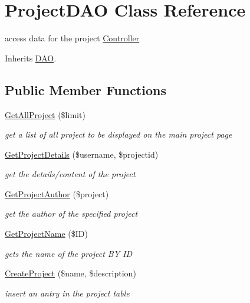 \hypertarget{class_project_d_a_o}{}\section{Project\+D\+AO Class Reference}
\label{class_project_d_a_o}


access data for the project \hyperlink{class_controller}{Controller}  




Inherits \hyperlink{class_d_a_o}{D\+AO}.

\subsection*{Public Member Functions}
\begin{DoxyCompactItemize}
\item 
\hyperlink{class_project_d_a_o_a66f83737d74fbe61fea6d8eeba29300a}{Get\+All\+Project} (\$limit)
\begin{DoxyCompactList}\small\item\em get a list of all project to be displayed on the main project page \end{DoxyCompactList}\item 
\hyperlink{class_project_d_a_o_aef077c373665972101668ce915526786}{Get\+Project\+Details} (\$username, \$projectid)
\begin{DoxyCompactList}\small\item\em get the details/content of the project \end{DoxyCompactList}\item 
\hyperlink{class_project_d_a_o_a2c8979ebd3a03bb6fc406d500cd128ef}{Get\+Project\+Author} (\$project)
\begin{DoxyCompactList}\small\item\em get the author of the specified project \end{DoxyCompactList}\item 
\hyperlink{class_project_d_a_o_a483563c27167fa2cbc95cc537527e994}{Get\+Project\+Name} (\$ID)
\begin{DoxyCompactList}\small\item\em gets the name of the project BY ID \end{DoxyCompactList}\item 
\hyperlink{class_project_d_a_o_ab33602f01ad5d9926c26dda5942292a3}{Create\+Project} (\$name, \$description)
\begin{DoxyCompactList}\small\item\em insert an antry in the project table \end{DoxyCompactList}\item 

\end{DoxyCompactItemize}

